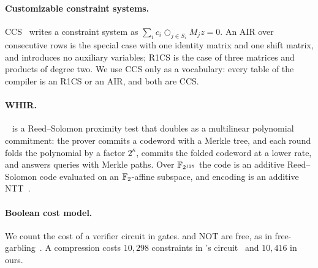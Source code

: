 \paragraph{Customizable constraint systems.} CCS~\citep{ccs} writes a constraint system as $\sum_i c_i \bigcirc_{j\in S_i} M_j z = 0$. An AIR over consecutive rows is the special case with one identity matrix and one shift matrix, and introduces no auxiliary variables; R1CS is the case of three matrices and products of degree two. We use CCS only as a vocabulary: every table of the compiler is an R1CS or an AIR, and both are CCS.

\paragraph{WHIR.} \WHIR{}~\citep{whir} is a Reed--Solomon proximity test that doubles as a multilinear polynomial commitment: the prover commits a codeword with a Merkle tree, and each round folds the polynomial by a factor $2^{\kappa}$, commits the folded codeword at a lower rate, and answers queries with Merkle paths. Over $\mathbb{F}_{2^{128}}$ the code is an additive Reed--Solomon code evaluated on an $\mathbb{F}_{2}$-affine subspace, and encoding is an additive NTT~\citep{binius,fri-binius}.

\paragraph{Boolean cost model.} We count the cost of a verifier circuit in \AND{} gates. \XOR{} and \textsf{NOT} are free, as in free-\XOR{} garbling~\citep{free-xor}. A \Blake{} compression costs $10{,}298$ \AND{} constraints in \Flock{}'s circuit~\citep{flock} and $10{,}416$ in ours.
